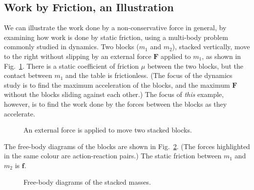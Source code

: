 \documentclass[11pt]{article}
\begin{document}
\subsection{Work by Friction, an Illustration}
We can illustrate the work done by a non-conservative force in general, by
examining how work is done by static friction, using a multi-body problem
commonly studied in dynamics. Two blocks ($m_1$ and $m_2$),
stacked vertically, move to the right without slipping by an external force
$\mathbf F$ applied to $m_1$, as shown in Fig.~\ref{stacked1}. There is a static
coefficient of friction $\mu$ between the two blocks, but the contact between
$m_1$ and the table is frictionless. (The focus of the dynamics study is to
find the maximum acceleration of the blocks, and the maximum $\mathbf F$
without the blocks sliding against each other.) The focus of \emph{this}
example, however, is to find the work done by the forces between the blocks as
they accelerate.
\begin{figure}[ht]
  \centering
  \caption{An external force is applied to move two stacked blocks.}
  \label{stacked1}
\end{figure}

The free-body diagrams of the blocks are shown in Fig.~\ref{stacked-fbd}.
(The forces highlighted in the same colour are action-reaction pairs.) The
static friction between $m_1$ and $m_2$ is $\mathbf f$.
\begin{figure}[ht]
  \centering
  \hspace{.2in}
  \caption{Free-body diagrams of the stacked masses.}
  \label{stacked-fbd}
\end{figure}
\end{document}
